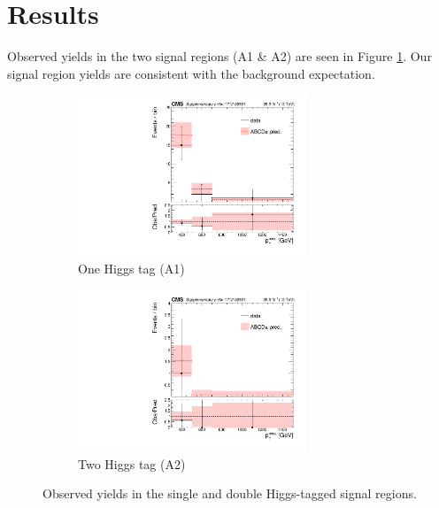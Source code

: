\section{Results}

Observed yields in the two signal regions (A1 \& A2) are seen in Figure \ref{fig:signalyields}. Our signal region yields are consistent with the background expectation.

\begin{figure}[htbp]

\begin{subfigure}[b]{0.5\textwidth}
\centering
\includegraphics[width=0.75\textwidth]{figs/CMS-SUS-17-006_Figure-aux_004.pdf}
\caption{One Higgs tag (A1)}
\end{subfigure}

\begin{subfigure}[b]{0.5\textwidth}
\centering
\includegraphics[width=0.75\textwidth]{figs/CMS-SUS-17-006_Figure-aux_005.pdf}
\caption{Two Higgs tag (A2)}
\end{subfigure}

\caption{Observed yields in the single and double Higgs-tagged signal regions.}
\label{fig:signalyields}
\end{figure}

